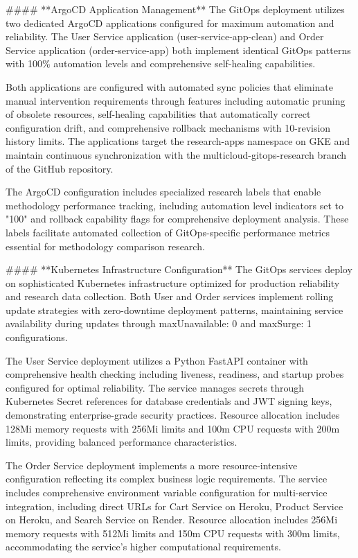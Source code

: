 #### **ArgoCD Application Management**
The GitOps deployment utilizes two dedicated ArgoCD applications configured for maximum automation and reliability. The User Service application (user-service-app-clean) and Order Service application (order-service-app) both implement identical GitOps patterns with 100\% automation levels and comprehensive self-healing capabilities.

Both applications are configured with automated sync policies that eliminate manual intervention requirements through features including automatic pruning of obsolete resources, self-healing capabilities that automatically correct configuration drift, and comprehensive rollback mechanisms with 10-revision history limits. The applications target the research-apps namespace on GKE and maintain continuous synchronization with the multicloud-gitops-research branch of the GitHub repository.

The ArgoCD configuration includes specialized research labels that enable methodology performance tracking, including automation level indicators set to "100" and rollback capability flags for comprehensive deployment analysis. These labels facilitate automated collection of GitOps-specific performance metrics essential for methodology comparison research.

#### **Kubernetes Infrastructure Configuration**
The GitOps services deploy on sophisticated Kubernetes infrastructure optimized for production reliability and research data collection. Both User and Order services implement rolling update strategies with zero-downtime deployment patterns, maintaining service availability during updates through maxUnavailable: 0 and maxSurge: 1 configurations.

The User Service deployment utilizes a Python FastAPI container with comprehensive health checking including liveness, readiness, and startup probes configured for optimal reliability. The service manages secrets through Kubernetes Secret references for database credentials and JWT signing keys, demonstrating enterprise-grade security practices. Resource allocation includes 128Mi memory requests with 256Mi limits and 100m CPU requests with 200m limits, providing balanced performance characteristics.

The Order Service deployment implements a more resource-intensive configuration reflecting its complex business logic requirements. The service includes comprehensive environment variable configuration for multi-service integration, including direct URLs for Cart Service on Heroku, Product Service on Heroku, and Search Service on Render. Resource allocation includes 256Mi memory requests with 512Mi limits and 150m CPU requests with 300m limits, accommodating the service's higher computational requirements.

